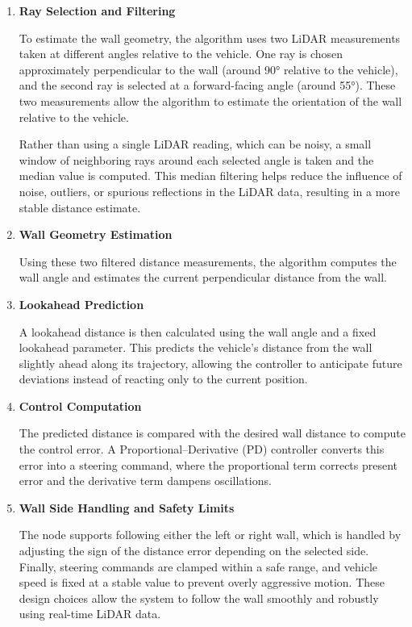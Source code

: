 \documentclass{article}
\begin{document}
\begin{enumerate}

\item \textbf{Ray Selection and Filtering}

To estimate the wall geometry, the algorithm uses two LiDAR measurements
taken at different angles relative to the vehicle. One ray is chosen approximately perpendicular to the wall (around 90° relative to the vehicle), and the second ray is selected at a forward-facing angle (around 55°). These two measurements allow the algorithm to estimate the orientation of the wall relative to the vehicle.

Rather than using a single LiDAR reading, which can be noisy, a small window of neighboring rays around each selected angle is taken and the median value is computed. This median filtering helps reduce the influence of noise, outliers, or spurious reflections in the LiDAR data, resulting in a more stable distance estimate.

\item \textbf{Wall Geometry Estimation}

Using these two filtered distance measurements, the algorithm computes the wall angle and estimates the current perpendicular distance from the wall.

\item \textbf{Lookahead Prediction}

A lookahead distance is then calculated using the wall angle and a fixed lookahead parameter. This predicts the vehicle’s distance from the wall slightly ahead along its trajectory, allowing the controller to anticipate future deviations instead of reacting only to the current position.

\item \textbf{Control Computation}

The predicted distance is compared with the desired wall distance to compute the control error. A Proportional–Derivative (PD) controller converts this error into a steering command, where the proportional term corrects present error and the derivative term dampens oscillations.

\item \textbf{Wall Side Handling and Safety Limits}

The node supports following either the left or right wall, which is handled by adjusting the sign of the distance error depending on the selected side. Finally, steering commands are clamped within a safe range, and vehicle speed is fixed at a stable value to prevent overly aggressive motion. These design choices allow the system to follow the wall smoothly and robustly using real-time LiDAR data.

\end{enumerate}
\end{document}
